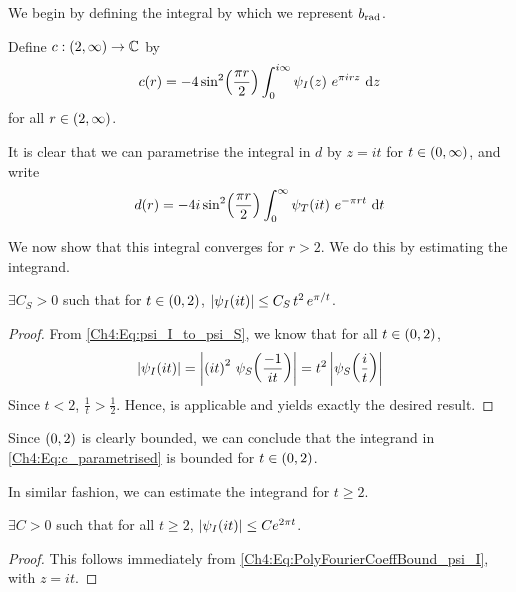 We begin by defining the integral by which we represent $b_{\operatorname{rad}}$.

\begin{boxdefinition}
    Define $c : \left( 2, \infty \right) \to \mathbb{C}$ by
    \begin{align*}
        c\!\left( r \right) = -4 \sin^2\!\left( \frac{\pi r}{2} \right) \int_{0}^{i\infty} \psi_I\!\left( z \right) \, e^{\pi i r z} \, \operatorname{d}\!{z}
    \end{align*}
    for all $r \in \left( 2, \infty \right)$.
\end{boxdefinition}

It is clear that we can parametrise the integral in $d$ by $z = it$ for $t \in \left( 0, \infty \right)$, and write
\begin{align}
    d(r) = -4i \sin^2\!\left( \frac{\pi r}{2} \right) \int_{0}^{\infty} \psi_T\!\left( it \right) \, e^{-\pi r t} \, \operatorname{d}\!{t}
    \label{Ch4:Eq:c_parametrised}
\end{align}

We now show that this integral converges for $r > 2$. We do this by estimating the integrand.

\begin{boxlemma}
    $\exists C_S > 0$ such that for $t \in \left( 0, 2 \right)$, $\left\lvert \psi_I\!\left( it \right) \right\rvert \leq C_S \, t^2 \, e^{\pi / t}$.
\end{boxlemma}
\begin{proof}
    From \eqref{Ch4:Eq:psi_I_to_psi_S}, we know that for all $t \in \left( 0, 2 \right)$,
    \begin{align*}
        \left\lvert \psi_I\!\left( it \right) \right\rvert
        = \left\lvert \left( it \right)^2 \, \psi_S\!\left( \frac{-1}{it} \right) \right\rvert
        = t^2 \left\lvert \psi_S\!\left( \frac{i}{t} \right) \right\rvert
    \end{align*}
    Since $t < 2$, $\frac{1}{t} > \frac{1}{2}$. Hence,  is applicable and yields exactly the desired result.
\end{proof}

Since $\left( 0, 2 \right)$ is clearly bounded, we can conclude that the integrand in \eqref{Ch4:Eq:c_parametrised} is bounded for $t \in \left( 0, 2 \right)$.

In similar fashion, we can estimate the integrand for $t \geq 2$.

\begin{boxlemma}
    $\exists C > 0$ such that for all $t \geq 2$, $\left\lvert \psi_I\!\left( it \right) \right\rvert \leq C e^{2 \pi t}$.
\end{boxlemma}
\begin{proof}
    This follows immediately from \eqref{Ch4:Eq:PolyFourierCoeffBound_psi_I}, with $z = it$.
\end{proof}

